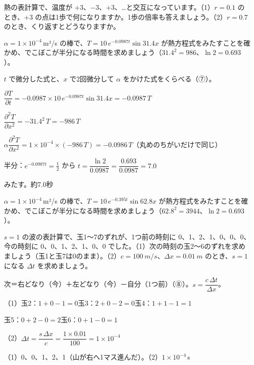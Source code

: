 \begin{jibun}
熱の表計算で、温度が $+3$、$-3$、$+3$、…と交互になっています。（1）$r=0.1$ のとき、$+3$ の点は1歩で何になりますか。1歩の倍率も答えましょう。（2）$r=0.7$ のとき、くり返すとどうなりますか。
\end{jibun}

\begin{reidai}[熱方程式に代入する]
$\alpha=1\times10^{-4}$\,m²/s の棒で、$T=10\,e^{-0.0987t}\sin31.4x$ が熱方程式をみたすことを確かめ、でこぼこが半分になる時間を求めましょう（$31.4^2=986$、$\ln2=0.693$）。\par
\kangaekata $t$ で微分した式と、$x$ で2回微分して $\alpha$ をかけた式をくらべる（⑦）。\par
\shiki $\dfrac{\partial T}{\partial t}=-0.0987\times10\,e^{-0.0987t}\sin31.4x=-0.0987\,T$\par
\kviiinq $\dfrac{\partial^2T}{\partial x^2}=-31.4^2\,T=-986\,T$\par
\kviiinq $\alpha\dfrac{\partial^2T}{\partial x^2}=1\times10^{-4}\times(-986\,T)=-0.0986\,T$（丸めのちがいだけで同じ）\par
\kviiinq 半分：$e^{-0.0987t}=\frac12$ から $t=\dfrac{\ln2}{0.0987}=\dfrac{0.693}{0.0987}=7.0$\par
\kotae みたす。約7.0秒
\end{reidai}

\begin{jibun}
$\alpha=1\times10^{-4}$\,m²/s の棒で、$T=10\,e^{-0.395t}\sin62.8x$ が熱方程式をみたすことを確かめ、でこぼこが半分になる時間を求めましょう（$62.8^2=3944$、$\ln2=0.693$）。
\end{jibun}

\begin{reidai}[波の表計算]
$s=1$ の波の表計算で、玉1〜7のずれが、1つ前の時刻に 0、1、2、1、0、0、0、今の時刻に 0、0、1、2、1、0、0 でした。（1）次の時刻の玉2〜6のずれを求めましょう（玉1と玉7は0のまま）。（2）$c=\qty{100}{m/s}$、$\Delta x=\qty{0.01}{m}$ のとき、$s=1$ になる $\Delta t$ を求めましょう。\par
\kangaekata 次＝右どなり（今）＋左どなり（今）－自分（1つ前）（⑧）。$s=\dfrac{c\,\Delta t}{\Delta x}$。\par
\shiki（1）玉2：$1+0-1=0$\quad 玉3：$2+0-2=0$\quad 玉4：$1+1-1=1$\par
\kviiinq 玉5：$0+2-0=2$\quad 玉6：$0+1-0=1$\par
\kviiinq（2）$\Delta t=\dfrac{s\,\Delta x}{c}=\dfrac{1\times0.01}{100}=1\times10^{-4}$\par
\kotae（1）0、0、1、2、1（山が右へ1マス進んだ）。（2）$1\times10^{-4}$\,s
\end{reidai}

